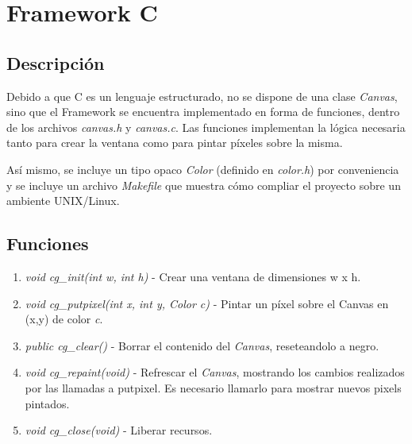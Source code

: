\documentclass[11pt]{amsart}
\begin{document}
\section{Framework C}

\subsection{Descripci\'on}
Debido a que C es un lenguaje estructurado, no se dispone de una clase \emph{Canvas}, sino que el Framework se encuentra implementado en forma de funciones, dentro de los archivos \emph{canvas.h} y \emph{canvas.c}. Las funciones implementan la l\'ogica necesaria tanto para crear la ventana como para pintar p\'ixeles sobre la misma.

As\'i mismo, se incluye un tipo opaco \emph{Color} (definido en \emph{color.h}) por conveniencia y se incluye un archivo \emph{Makefile} que muestra c\'omo compliar el proyecto sobre un ambiente UNIX/Linux.

\subsection{Funciones}
\begin{enumerate}
	\item \emph{void cg\_init(int w, int h)} - Crear una ventana de dimensiones w x h.
	\item \emph{void cg\_putpixel(int x, int y, Color c)} - Pintar un p\'ixel sobre el Canvas en (x,y) de color \emph{c}.
	\item \emph{public cg\_clear()} - Borrar el contenido del \emph{Canvas}, reseteandolo a negro.
	\item \emph{void cg\_repaint(void)} - Refrescar el \emph{Canvas}, mostrando los cambios realizados por las llamadas a putpixel. Es necesario llamarlo para mostrar nuevos pixels pintados.
	\item \emph{void cg\_close(void)} - Liberar recursos.
\end{enumerate}
\end{document}
